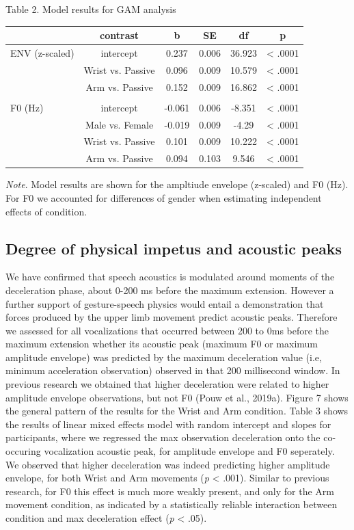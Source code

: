\documentclass[
  man,floatsintext]{apa6}
\begin{document}
Table 2. Model results for GAM analysis

\begin{tabular}{lccccc}
\toprule
  & contrast & b & SE & df & p\\
\midrule
ENV (z-scaled) & intercept & 0.237 & 0.006 & 36.923 & < .0001\\
 & Wrist vs. Passive & 0.096 & 0.009 & 10.579 & < .0001\\
 & Arm vs. Passive & 0.152 & 0.009 & 16.862 & < .0001\\
 &  &  &  &  & \\
F0 (Hz) & intercept & -0.061 & 0.006 & -8.351 & < .0001\\
\addlinespace
 & Male vs. Female & -0.019 & 0.009 & -4.29 & < .0001\\
 & Wrist vs. Passive & 0.101 & 0.009 & 10.222 & < .0001\\
 & Arm vs. Passive & 0.094 & 0.103 & 9.546 & < .0001\\
\bottomrule
\end{tabular}

\emph{Note}. Model results are shown for the ampltiude envelope (z-scaled) and F0 (Hz). For F0 we accounted for differences of gender when estimating independent effects of condition.

\hypertarget{degree-of-physical-impetus-and-acoustic-peaks}{%
\subsection{Degree of physical impetus and acoustic peaks}\label{degree-of-physical-impetus-and-acoustic-peaks}}

We have confirmed that speech acoustics is modulated around moments of the deceleration phase, about 0-200 ms before the maximum extension. However a further support of gesture-speech physics would entail a demonstration that forces produced by the upper limb movement predict acoustic peaks. Therefore we assessed for all vocalizations that occurred between 200 to 0ms before the maximum extension whether its acoustic peak (maximum F0 or maximum amplitude envelope) was predicted by the maximum deceleration value (i.e, minimum acceleration observation) observed in that 200 millisecond window. In previous research we obtained that higher deceleration were related to higher amplitude envelope observations, but not F0 (Pouw et al., 2019a).
Figure 7 shows the general pattern of the results for the Wrist and Arm condition. Table 3 shows the results of linear mixed effects model with random intercept and slopes for participants, where we regressed the max observation deceleration onto the co-occuring vocalization acoustic peak, for amplitude envelope and F0 seperately. We observed that higher deceleration was indeed predicting higher amplitude envelope, for both Wrist and Arm movements (\emph{p} \textless{} .001). Similar to previous research, for F0 this effect is much more weakly present, and only for the Arm movement condition, as indicated by a statistically reliable interaction between condition and max deceleration effect (\emph{p} \textless{} .05).
\end{document}
